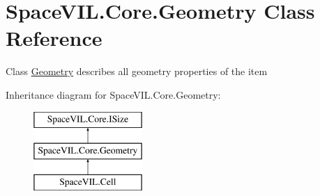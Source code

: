 \hypertarget{class_space_v_i_l_1_1_core_1_1_geometry}{}\section{Space\+V\+I\+L.\+Core.\+Geometry Class Reference}
\label{class_space_v_i_l_1_1_core_1_1_geometry}


Class \mbox{\hyperlink{class_space_v_i_l_1_1_core_1_1_geometry}{Geometry}} describes all geometry properties of the item  


Inheritance diagram for Space\+V\+I\+L.\+Core.\+Geometry\+:\begin{figure}[H]
\begin{center}
\leavevmode
\includegraphics[height=3.000000cm]{class_space_v_i_l_1_1_core_1_1_geometry}
\end{center}
\end{figure}
